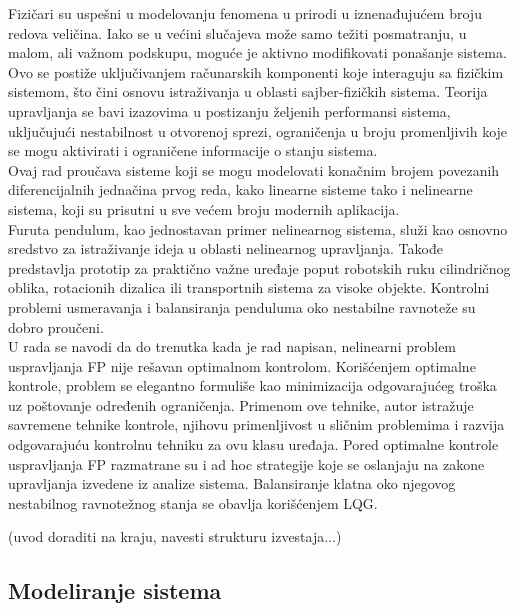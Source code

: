 \documentclass[a4paper,11pt]{article}
\theoremstyle{definition} \newtheorem{deff}{Definicija}[section]
\theoremstyle{definition} \newtheorem{prim}[deff]{Primer}
\theoremstyle{plain} \newtheorem{teor}[deff]{Teorema}
\begin{document}
	Fizičari su uspešni u modelovanju fenomena u prirodi u iznenađujućem broju redova veličina. Iako se u većini slučajeva može samo težiti posmatranju, u malom, ali važnom podskupu, moguće je aktivno modifikovati ponašanje sistema. Ovo se postiže uključivanjem računarskih komponenti koje interaguju sa fizičkim sistemom, što čini osnovu istraživanja u oblasti sajber-fizičkih sistema. Teorija upravljanja se bavi izazovima u postizanju željenih performansi sistema, uključujući nestabilnost u otvorenoj sprezi, ograničenja u broju promenljivih koje se mogu aktivirati i ograničene informacije o stanju sistema.\\
	
	Ovaj rad proučava sisteme koji se mogu modelovati konačnim brojem povezanih diferencijalnih jednačina prvog reda, kako linearne sisteme tako i nelinearne sistema, koji su prisutni u sve većem broju modernih aplikacija. \\
	
	Furuta pendulum, kao jednostavan primer nelinearnog sistema, služi kao osnovno sredstvo za istraživanje ideja u oblasti nelinearnog upravljanja. Takođe predstavlja prototip za praktično važne uređaje poput robotskih ruku cilindričnog oblika, rotacionih dizalica ili transportnih sistema za visoke objekte. Kontrolni problemi usmeravanja i balansiranja penduluma oko nestabilne ravnoteže su dobro proučeni.\\
	
	U rada \cite{inicijalna} se navodi da do trenutka kada je rad napisan, nelinearni problem uspravljanja FP nije rešavan optimalnom kontrolom. Korišćenjem optimalne kontrole, problem se elegantno formuliše kao minimizacija odgovarajućeg troška uz poštovanje određenih ograničenja. Primenom ove tehnike, autor istražuje savremene tehnike kontrole, njihovu primenljivost u sličnim problemima i razvija odgovarajuću kontrolnu tehniku za ovu klasu uređaja. Pored optimalne kontrole uspravljanja FP razmatrane su i ad hoc strategije koje se oslanjaju na zakone upravljanja izvedene iz analize sistema. Balansiranje klatna oko njegovog nestabilnog ravnotežnog stanja se obavlja korišćenjem LQG. 
	
	(uvod doraditi na kraju, navesti strukturu izvestaja...)
	
	
	\newpage
	
	\subsection{Modeliranje sistema} 
	
\end{document}
